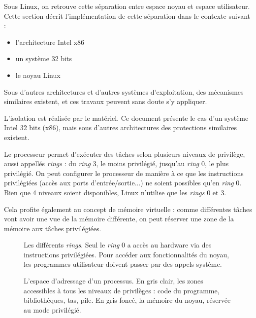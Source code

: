 Sous Linux, on retrouve cette séparation entre espace noyau et espace
utilisateur. Cette section décrit l'implémentation de cette séparation dans le
contexte suivant :

\begin{itemize}
\item l'architecture Intel x86
\item un système 32 bits
\item le noyau Linux
\end{itemize}

Sous d'autres architectures et d'autres systèmes d'exploitation, des mécanismes
similaires existent, et ces travaux peuvent sans doute s'y appliquer.

L'isolation est réalisée par le matériel. Ce document présente le cas d'un
système Intel 32 bits (x86), mais sous d'autres architectures des protections
similaires existent.

Le processeur permet d'exécuter des tâches selon plusieurs niveaux de privilège,
aussi appellés \emph{rings} : du \emph{ring} 3, le moins privilégié, jusqu'au
\emph{ring} 0, le plus privilégié. On peut configurer le processeur de manière à
ce que les instructions privilégiées (accès aux ports d'entrée/sortie...) ne
soient possibles qu'en \emph{ring} 0. Bien que 4 niveaux soient disponibles,
Linux n'utilise que les \emph{rings} 0 et 3.

Cela profite également au concept de mémoire virtuelle : comme différentes
tâches vont avoir une vue de la mémoire différente, on peut réserver une zone de
la mémoire aux tâches privilégiées.

\begin{figure}



\caption{Les différents \emph{rings}. Seul le \emph{ring} 0 a accès au hardware
via des instructions privilégiées. Pour accéder aux fonctionnalités du noyau,
les programmes utilisateur doivent passer par des appels système.}

\label{fig:rings}
\end{figure}

\begin{figure}
\centering
\fbox{
  
}

\caption{L'espace d'adressage d'un processus. En gris clair, les zones
accessibles à tous les niveaux de privilèges : code du programme, bibliothèques,
tas, pile. En gris foncé, la mémoire du noyau, réservée au mode privilégié.}

\label{fig:memmap}
\end{figure}

